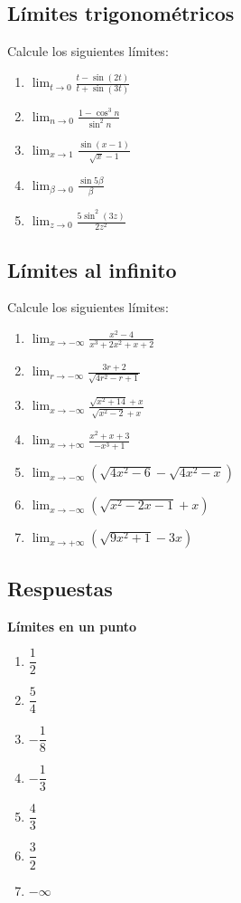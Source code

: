 \documentclass[12pt]{article}
\begin{document}
\subsection{Límites trigonométricos}
Calcule los siguientes límites:
\begin{enumerate}
    \item $\displaystyle \lim_{t \to 0} \frac{t - \sin(2t)}{t + \sin(3t)}$
    \item $\displaystyle \lim_{n \to 0} \frac{1 - \cos^3 n}{\sin^2 n}$
    \item $\displaystyle \lim_{x \to 1} \frac{\sin(x - 1)}{\sqrt{x} - 1}$
    \item $\displaystyle \lim_{\beta \to 0} \frac{\sin 5\beta}{\beta}$
    \item $\displaystyle \lim_{z \to 0} \frac{5\sin^2(3z)}{2z^2}$
\end{enumerate}

\subsection{Límites al infinito}
Calcule los siguientes límites:
\begin{enumerate}
    \item $\displaystyle \lim_{x \to -\infty} \frac{x^2 - 4}{x^3 + 2x^2 + x + 2}$
    \item $\displaystyle \lim_{r \to -\infty} \frac{3r + 2}{\sqrt{4r^2 - r + 1}}$
    \item $\displaystyle \lim_{x \to -\infty} \frac{\sqrt{x^2 + 14} + x}{\sqrt{x^2 - 2} + x}$
    \item $\displaystyle \lim_{x \to +\infty} \frac{x^2 + x + 3}{-x^3 + 1}$
    \item $\displaystyle \lim_{x \to -\infty} \left(\sqrt{4x^2 - 6} - \sqrt{4x^2 - x}\right)$
    \item $\displaystyle \lim_{x \to -\infty} \left(\sqrt{x^2 - 2x - 1} + x\right)$
    \item $\displaystyle \lim_{x \to +\infty} \left(\sqrt{9x^2 + 1} - 3x\right)$
\end{enumerate}

\subsection{Respuestas}

\textbf{Límites en un punto}
\begin{enumerate}
    \item $\dfrac{1}{2}$
    \item $\dfrac{5}{4}$
    \item $-\dfrac{1}{8}$
    \item $-\dfrac{1}{3}$
    \item $\dfrac{4}{3}$
    \item $\dfrac{3}{2}$
    \item $-\infty$
\end{enumerate}
\end{document}
